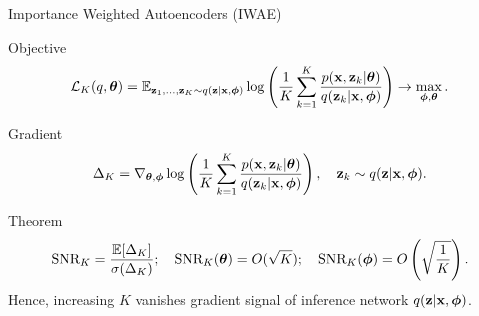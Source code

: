 \documentclass{beamer}
\begin{document}
\begin{frame}{Importance Weighted Autoencoders (IWAE)}
	\begin{block}{Objective}
		\vspace{-0.5cm}
		\[
		\mathcal{L}_K (q, \boldsymbol{\theta})  = \mathbb{E}_{\mathbf{z}_1, \dots, \mathbf{z}_K \sim q(\mathbf{z} | \mathbf{x}, \boldsymbol{\phi})} \log \left( \frac{1}{K}\sum_{k=1}^K\frac{p(\mathbf{x}, \mathbf{z}_k | \boldsymbol{\theta})}{q(\mathbf{z}_k| \mathbf{x}, \boldsymbol{\phi})} \right) \rightarrow \max_{\boldsymbol{\phi}, \boldsymbol{\theta}}.
		\]
		\vspace{-0.3cm}
	\end{block}
	\begin{block}{Gradient}
		\vspace{-0.3cm}
		\[
		\Delta_K = \nabla_{\boldsymbol{\theta}, \boldsymbol{\phi}} \log \left( \frac{1}{K}\sum_{k=1}^K\frac{p(\mathbf{x}, \mathbf{z}_k | \boldsymbol{\theta})}{q(\mathbf{z}_k| \mathbf{x}, \boldsymbol{\phi})} \right), \quad \mathbf{z}_k \sim q(\mathbf{z} | \mathbf{x}, \boldsymbol{\phi}).
		\]
		\vspace{-0.3cm}
	\end{block}
	\begin{block}{Theorem}
		\vspace{-0.4cm}
		\[
		\text{SNR}_K = \frac{\mathbb{E} [\Delta_K]}{\sigma(\Delta_K)}; \quad
		\text{SNR}_K(\boldsymbol{\theta}) = O(\sqrt{K}); \quad 
		\text{SNR}_K(\boldsymbol{\phi}) = O\left(\sqrt{\frac{1}{K}}\right).
		\]
		Hence, increasing $K$ vanishes gradient signal of inference network $q(\mathbf{z} | \mathbf{x}, \boldsymbol{\phi})$.
	\end{block}
	
\end{frame}
\end{document}
